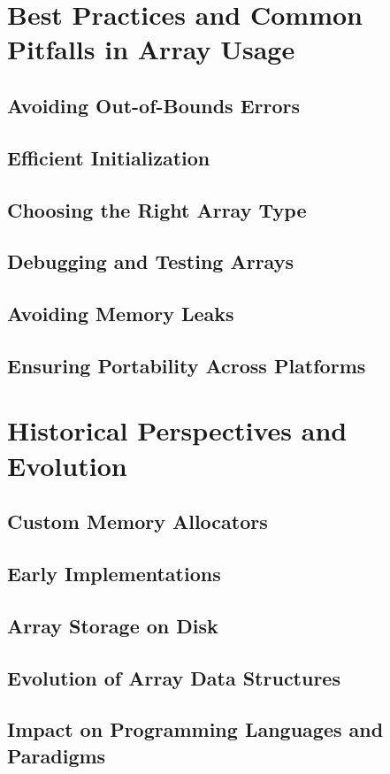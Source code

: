 \documentclass[12pt, oneside]{book}
\begin{document}
\chapter{Best Practices and Common Pitfalls in Array Usage}
\section{Avoiding Out-of-Bounds Errors}
\section{Efficient Initialization}
\section{Choosing the Right Array Type}
\section{Debugging and Testing Arrays}
\section{Avoiding Memory Leaks}
\section{Ensuring Portability Across Platforms}

\chapter{Historical Perspectives and Evolution}
\section{Custom Memory Allocators}\section{Early Implementations}
\section{Array Storage on Disk}\section{Evolution of Array Data Structures}
\section{Impact on Programming Languages and Paradigms}
\end{document}
